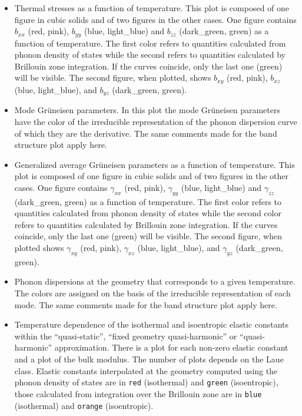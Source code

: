 \documentclass[12pt,a4paper,twoside]{report}
\begin{document}
\begin{itemize}
\item
Thermal stresses as a function of temperature. This plot is composed of
one figure in cubic solids and of two figures in the other cases. 
One figure contains $b_{xx}$ (red, pink), $b_{yy}$ (blue, light\_blue)
and $b_{zz}$ (dark\_green, green) as a function of temperature. 
The first color refers to quantities calculated from phonon density of states
while the second refers to quantities calculated by Brillouin zone
integration. If the curves coincide, only the last one (green) will 
be visible. The second figure, when plotted, shows $b_{xy}$ (red, pink), 
$b_{xz}$ (blue, light\_blue), and $b_{yz}$ (dark\_green, green).

\item
Mode Gr\"uneisen parameters. In this plot the mode Gr\"uneisen parameters have
the color of the irreducible representation of the phonon dispersion curve
of which they are the derivative.
The same comments made for the band structure plot apply here.

\item
Generalized average Gr\"uneisen parameters as a function of temperature. 
This plot is composed of one figure in cubic solids and of two figures in 
the other cases. 
One figure contains $\gamma_{xx}$ (red, pink), $\gamma_{yy}$ (blue, light\_blue)
and $\gamma_{zz}$ (dark\_green, green) as a function of temperature. 
The first color refers to quantities calculated from phonon density of states
while the second color refers to quantities calculated by Brillouin zone
integration.
If the curves coincide, only the last one (green) will be visible. 
The second figure, 
when plotted shows $\gamma_{xy}$ (red, pink), $\gamma_{xz}$ 
(blue, light\_blue), and $\gamma_{yz}$ (dark\_green, green).

\item
Phonon dispersions at the geometry that corresponds to a given temperature. 
The colors are assigned on the basis of the irreducible representation of
each mode. The same comments made for the band structure plot apply here.

\item
Temperature dependence of the isothermal and isoentropic elastic constants 
within the ``quasi-static'', ``fixed geometry quasi-harmonic'' or
``quasi-harmonic'' approximation. There is a plot for each non-zero
elastic constant and a plot of the bulk modulus. The number of plots 
depends on the Laue class. 
Elastic constants 
interpolated at the geometry computed using the phonon density of states 
are in \texttt{red} (isothermal) and \texttt{green} (isoentropic), 
those calculated from integration over the 
Brillouin zone are in \texttt{blue} (isothermal) and \texttt{orange} 
(isoentropic).


\end{itemize}
\end{document}
